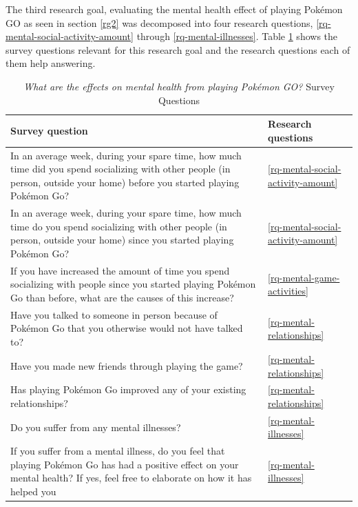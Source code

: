 The third research goal, evaluating the mental health effect of playing Pokémon GO as seen in section \ref{rg2} was decomposed into four research questions, \ref{rq-mental-social-activity-amount} through \ref{rq-mental-illnesses}. Table \ref{tbl:rg3-survey-questions} shows the survey questions relevant for this research goal and the research questions each of them help answering.

\begin{table}[h]
	\caption{\emph{What are the effects on mental health from playing Pokémon GO?} Survey Questions}
	\centering
	\label{tbl:rg3-survey-questions}
	\begin{tabularx}{\textwidth}{|X|l|}
		\hline
		\textbf{Survey question} & \textbf{Research questions}\\
		\hline\hline
		
		In an average week, during your spare time, how much time did you spend socializing with other people (in person, outside your home) before you started playing Pokémon Go? & \ref{rq-mental-social-activity-amount}\\
		\hline
		
		In an average week, during your spare time, how much time do you spend socializing with other people (in person, outside your home) since you started playing Pokémon Go? & \ref{rq-mental-social-activity-amount}\\
		\hline
		
		If you have increased the amount of time you spend socializing with people since you started playing Pokémon Go than before, what are the causes of this increase? & \ref{rq-mental-game-activities}\\
		\hline
		
		Have you talked to someone in person because of Pokémon Go that you otherwise would not have talked to? & \ref{rq-mental-relationships}\\
		\hline
		
		Have you made new friends through playing the game? & \ref{rq-mental-relationships}\\
		\hline
		
		Has playing Pokémon Go improved any of your existing relationships? & \ref{rq-mental-relationships}\\
		\hline
		
		Do you suffer from any mental illnesses? & \ref{rq-mental-illnesses}\\
		\hline
		
		If you suffer from a mental illness, do you feel that playing Pokémon Go has had a positive effect on your mental health? If yes, feel free to elaborate on how it has helped you & \ref{rq-mental-illnesses}\\
		\hline
	\end{tabularx}
\end{table}